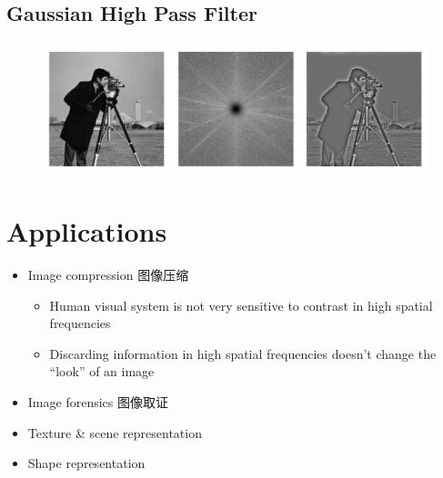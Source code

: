 \documentclass[11pt]{article}
\begin{document}
\subsection{Gaussian High Pass Filter}
\begin{figure}[bht!]
  \centering
  \includegraphics[width=\textwidth]{images/ghp.png}
\end{figure}



\section{Applications}
\begin{itemize}
  \item Image compression 图像压缩
        \begin{itemize}
          \item Human visual system is not very sensitive to contrast in high spatial frequencies
          \item Discarding information in high spatial frequencies doesn’t change the “look” of an image
        \end{itemize}
  \item Image forensics 图像取证
  \item Texture \& scene representation
  \item Shape representation
\end{itemize}
\end{document}
